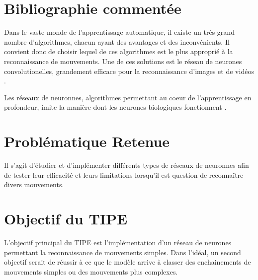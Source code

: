 \documentclass[a4paper, 11pt]{article}
\let\cite=\supercite
\begin{document}
\section*{Bibliographie comment\'ee}

Dans le vaste monde de l'apprentissage automatique, il existe un très grand nombre
d'algorithmes, chacun ayant des avantages et des inconvénients. Il convient donc de
choisir lequel de ces algorithmes est le plus approprié à la reconnaissance de
mouvements.
Une de ces solutions est le réseau de neurones convolutionelles, grandement efficace
pour la reconnaissance d'images et de vidéos \cite{cnn}.

Les réseaux de neuronnes, algorithmes permettant au coeur de l'apprentissage en
profondeur, imite la manière dont les neurones biologiques fonctionnent 
\cite{web:nnBook}.


\section*{Probl\'ematique Retenue}

Il s'agit d'étudier et d'implémenter différents types de réseaux de neuronnes afin de
tester leur efficacité et leurs limitations lorsqu'il est question de reconnaître 
divers mouvements.

\section*{Objectif du TIPE}
\begin{enumerate}
    L'objectif principal du TIPE est l'implémentation d'un réseau de neurones
    permettant la reconnaissance de mouvements simples. Dans l'idéal, un second objectif
    serait de réussir à ce que le modèle arrive à classer des enchainements de mouvements
    simples ou des mouvements plus complexes.
\end{enumerate}


\printbibliography[title=Références bibliographiques] 
\end{document}
